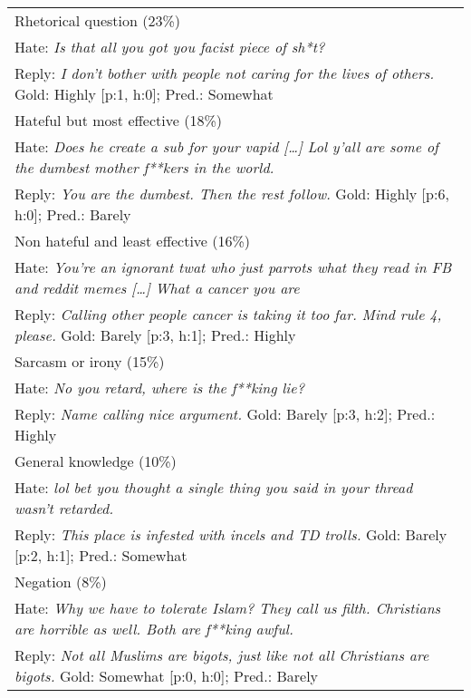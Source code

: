 \documentclass[11pt]{article}
\begin{document}
\begin{table*}
	\small
	\centering
	\begin{tabular}{@{}p{\textwidth}@{}}
		\toprule
		Rhetorical question (23\%) \\ \addlinespace
		Hate: \emph{Is that all you got you facist piece of sh*t?} \\
		Reply: \emph{I don't bother with people not caring for the lives of others.} \hfill Gold: Highly [p:1, h:0]; Pred.: Somewhat  \\ \midrule
		
		Hateful but most effective (18\%) \\ \addlinespace
		Hate: \emph{Does he create a sub for your vapid [\ldots]
			Lol y'all are some of the dumbest mother f**kers in the world.} \\
		Reply: \emph{You are the dumbest. Then the rest follow.} \hfill Gold: Highly [p:6, h:0]; Pred.: Barely \\ \midrule
		
		Non hateful and least effective (16\%) \\ \addlinespace
		Hate: \emph{You're an ignorant twat who just parrots what they read in FB and reddit memes [\ldots] 
			What a cancer you are
		} \\
		Reply: \emph{Calling other people cancer is taking it 
			too far. Mind rule 4, please.} \hfill Gold: Barely [p:3, h:1]; Pred.: Highly \\ \midrule
		
		Sarcasm or irony (15\%) \\ \addlinespace
		Hate: \emph{No you retard, where is the f**king lie?} \\
		Reply: \emph{Name calling nice argument.} \hfill Gold: Barely [p:3, h:2]; Pred.: Highly \\ \midrule
		
		General knowledge (10\%) \\ \addlinespace
		Hate: \emph{lol bet you thought a single thing you said in your thread wasn't retarded.} \\
		Reply: \emph{This place is infested with incels and TD trolls.} \hfill Gold: Barely [p:2, h:1]; Pred.: Somewhat \\ \midrule
		
		Negation (8\%) \\ \addlinespace
		Hate: \emph{Why we have to tolerate Islam? %
			They call us filth. Christians are horrible as well. Both are f**king awful.} \\
		Reply: \emph{Not all Muslims are bigots, just like not all Christians are bigots.} \hfill Gold: Somewhat [p:0, h:0]; Pred.: Barely \\ \midrule
	\end{tabular}
	

\end{table*}
\end{document}
